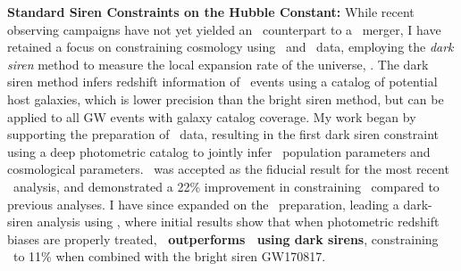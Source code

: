 \textbf{Standard Siren Constraints on the Hubble Constant:}
While recent observing campaigns have not yet yielded an \EM\ counterpart to a \GW\ merger, I have retained a focus on constraining cosmology using \EM\ and \GW\ data, employing the \textit{dark siren} method to measure the local expansion rate of the universe, \Ho. 
The dark siren method infers redshift information of \GW\ events using a catalog of potential host galaxies, which is lower precision than the bright siren method, but can be applied to all GW events with galaxy catalog coverage.
My work began by supporting the preparation of \DES\ data, resulting in the first dark siren constraint using a deep photometric catalog to jointly infer \GW\ population parameters and cosmological parameters. \DES\ was accepted as the fiducial result for the most recent \LVK\ analysis, and demonstrated a 22\% improvement in constraining \Ho\ compared to previous analyses. I have since expanded on the \DES\ preparation, leading a dark-siren analysis using \DELVE, where initial results show that when photometric redshift biases are properly treated, \textbf{\DELVE\ outperforms \DES\ using dark sirens}, constraining \Ho\ to 11\% when combined with the bright siren GW170817. %

